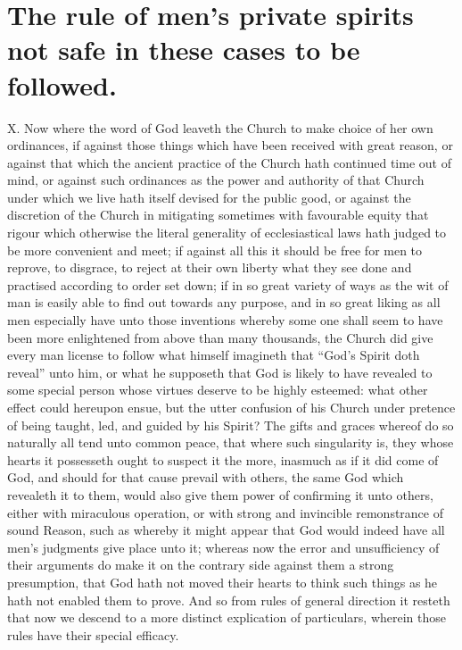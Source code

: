 \section*{The rule of men’s private spirits not safe in these cases to be followed.}
X. Now where the word of God leaveth the Church to make choice of her own ordinances, if against those things which have been received with great reason, or against that which the ancient practice of the Church hath continued time out of mind, or against such ordinances as the power and authority of that Church under which we live hath itself devised for the public good, or against the discretion of the Church in mitigating sometimes with favourable equity that rigour which otherwise the literal generality of ecclesiastical laws hath judged to be more convenient and meet; if against all this it should be free for men to reprove, to disgrace, to reject at their own liberty what they see done and practised according to order set down; if in so great variety of ways as the wit of man is easily able to find out towards any purpose, and in so great liking as all men especially have unto those inventions whereby some one shall seem to have been more enlightened from above than many thousands, the Church did give every man license to follow what himself imagineth that “God’s Spirit doth reveal” unto him, or what he supposeth that God is likely to have revealed to some special person whose virtues deserve to be highly esteemed: what other effect could hereupon ensue, but the utter confusion of his Church under pretence of being taught, led, and guided by his Spirit? The gifts and graces whereof do so naturally all tend unto common peace, that where such singularity is, they whose hearts it possesseth ought to suspect it the more, inasmuch as if it did come of God, and should for that cause prevail with others, the same God which revealeth it to them, would also give them power of confirming it unto others, either with miraculous operation, or with strong and invincible remonstrance of sound Reason, such as whereby it might appear that God would indeed have all men’s judgments give place unto it; whereas now the error and unsufficiency of their arguments do make it on the contrary side against them a strong presumption, that God hath not moved their hearts to think such things as he hath not enabled them to prove.
And so from rules of general direction it resteth that  now we descend to a more distinct explication of particulars, wherein those rules have their special efficacy.

